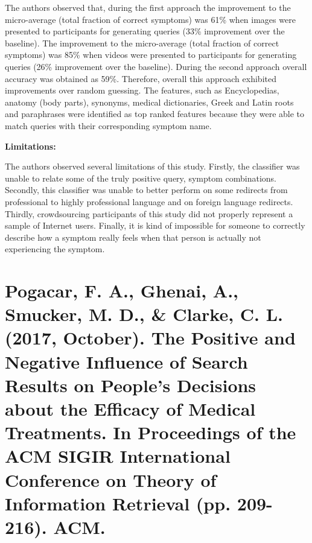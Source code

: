 \documentclass[]{article}
\begin{document}
The authors observed that, during the first approach the improvement to the micro-average (total fraction of correct symptoms) was 61\% when images were presented to participants for generating queries (33\% improvement over the baseline). The improvement to the micro-average (total fraction of correct symptoms) was 85\% when videos were presented to participants for generating queries (26\% improvement over the baseline). During the second approach overall accuracy was obtained as 59\%. Therefore, overall this approach exhibited improvements over random guessing. The features, such as Encyclopedias, anatomy (body parts), synonyms, medical dictionaries, Greek and Latin roots and paraphrases were identified as top ranked features because they were able to match queries with their corresponding symptom name. 

\textbf{Limitations:} 

The authors observed several limitations of this study. Firstly, the classifier was unable to relate some of the truly positive query, symptom combinations. Secondly, this classifier was unable to better perform on some redirects from professional to highly professional language and on foreign language redirects. Thirdly, crowdsourcing participants of this study did not properly represent a sample of Internet users. Finally, it is kind of impossible for someone to correctly describe how a symptom really feels when that person is actually not experiencing the symptom. 

\section{Pogacar, F. A., Ghenai, A., Smucker, M. D., \& Clarke, C. L. (2017, October). The Positive and Negative Influence of Search Results on People's Decisions about the Efficacy of Medical Treatments. In Proceedings of the ACM SIGIR International Conference on Theory of Information Retrieval (pp. 209-216). ACM.}
\end{document}
